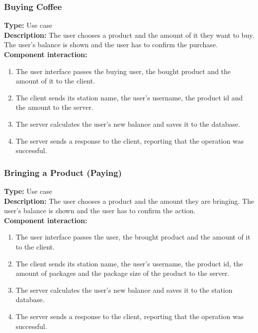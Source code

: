 \documentclass[11pt]{article}
\begin{document}
\subsubsection{Buying Coffee}
\textbf{Type:} Use case\\
\textbf{Description:} The user chooses a product and the amount of it they want to buy. 
The user's balance is shown and the user has to confirm the purchase.\\
\textbf{Component interaction:}
\begin{enumerate} 
\item{The user interface passes the buying user, the bought product and the amount of it to the client.}
\item{The client sends its station name, the user's username, the product id and the amount to the server.}
\item{The server calculates the user's new balance and saves it to the database.}
\item{The server sends a response to the client, reporting that the operation was successful.}
\end{enumerate}

\subsubsection{Bringing a Product (Paying)}
\textbf{Type:} Use case\\
\textbf{Description:} The user chooses a product and the amount they are bringing. 
The user's balance is shown and the user has to confirm the action.\\
\textbf{Component interaction:}
\begin{enumerate} 
\item{The user interface passes the user, the brought product and the amount of it to the client.}
\item{The client sends its station name, the user's username, the product id, the amount of packages and the package size of the product to the server.}
\item{The server calculates the user's new balance and saves it to the station database.}
\item{The server sends a response to the client, reporting that the operation was successful.}
\end{enumerate}
\end{document}
